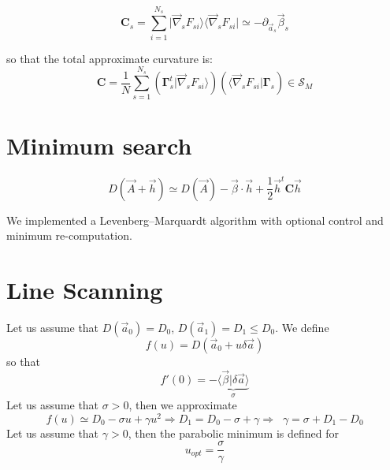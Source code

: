 \documentclass[aps,12pt]{revtex4}
\begin{document}
\begin{equation}
	\bm{C}_s = \sum_{i=1}^{N_s} \vert \vec{\nabla}_s F_{si} \rangle  \langle \vec{\nabla}_s F_{si} \vert \simeq -\partial_{\vec{a}_s} \vec{\beta}_s 
\end{equation}

so that the total approximate curvature is:
\begin{equation}
	\bm{C} =  \dfrac{1}{N} \sum_{s=1}^{N_s} \left(  \bm{\Gamma}_s^t \vert \vec{\nabla}_s F_{si} \rangle\right) \left( \langle \vec{\nabla}_s F_{si} \vert \bm{\Gamma}_s\right) \in \mathcal{S}_M
\end{equation}


\section{Minimum search}

\begin{equation}
	D(\vec{A} + \vec{h}) \simeq D(\vec{A}) - \vec{\beta} \cdot \vec{h} + \dfrac{1}{2} \vec{h}^t \bm{C} \vec{h}
\end{equation}

We implemented a Levenberg–Marquardt algorithm with optional control and minimum re-computation.

\section{Line Scanning}

Let us assume that $D(\vec{a}_0) = D_0$, $D(\vec{a}_1) = D_1 \leq D_0$.
We define
$$
	f(u) = D(\vec{a}_0 + u \delta\vec{a})
$$
so that
$$
	f'(0) = -\underbrace{\langle\vec{\beta}\vert\delta\vec{a}\rangle}_{\sigma}
$$
Let us assume that $\sigma>0$, then we approximate
$$
	f(u) \simeq D_0 - \sigma u + \gamma u^2 \Rightarrow D_1 = D_0 - \sigma + \gamma \Rightarrow \;\; \gamma = \sigma + D_1 - D_0
$$	
Let us assume that $\gamma>0$, then the parabolic minimum is defined for
$$
	u_{opt} = \dfrac{\sigma}{\gamma}
$$
\end{document}
